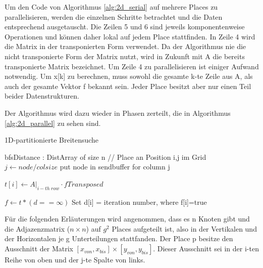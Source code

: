Um den Code von Algorithmus \ref{alg:2d_serial} auf mehrere Places zu parallelisieren, werden die einzelnen Schritte betrachtet und die Daten entsprechend ausgetauscht. Die Zeilen 5 und 6 sind jeweils komponentenweise Operationen und können daher lokal auf jedem Place stattfinden. In Zeile 4 wird die Matrix in der transponierten Form verwendet. Da der Algorithmus nie die nicht transponierte Form der Matrix nutzt, wird in Zukunft mit A die bereits transponierte Matrix bezeichnet. Um Zeile 4 zu parallelisieren ist einiger Aufwand notwendig. Um x[k] zu berechnen, muss sowohl die gesamte k-te Zeile aus A, als auch der gesamte Vektor f bekannt sein. Jeder Place besitzt aber nur einen Teil beider Datenstrukturen.

Der Algorithmus wird dazu wieder in Phasen zerteilt, die in Algorithmus \ref{alg:2d_parallel} zu sehen sind.

 \begin{algorithm}[h]
	\caption{1D-partitionierte Breitensuche}
	\label{alg:2d_parallel}
	\begin{algorithmic}[1]
		\State bfsDistance : DistArray of size n 
			\State // Place an Position i,j im Grid
					\State $j \gets \mathit{node} / \mathit{colsize} $
					\State put node in sendbuffer for column j
				\EndFor

					\State $t[i] \gets A\big|_{i-th\;row} \cdot \mathit{fTransposed}$
				\EndFor

				\EndFor

				\State $f \gets t * (d==\infty)$
				\State Set d[i] = iteration number, where f[i]=true
			\EndWhile
		\EndFor
	\end{algorithmic}
\end{algorithm}
Für die folgenden Erläuterungen wird angenommen, dass es n Knoten gibt und die Adjazenzmatrix ($n \times n$) auf $g^2$ Places aufgeteilt ist, also in der Vertikalen und der Horizontalen je g Unterteilungen stattfanden. Der Place p besitze den Ausschnitt der Matrix $\left[x_{von}, x_{bis} \right] \times \left[y_{von}, y_{bis} \right]$. Dieser Ausschnitt sei in der i-ten Reihe von oben und der j-te Spalte von links. 


